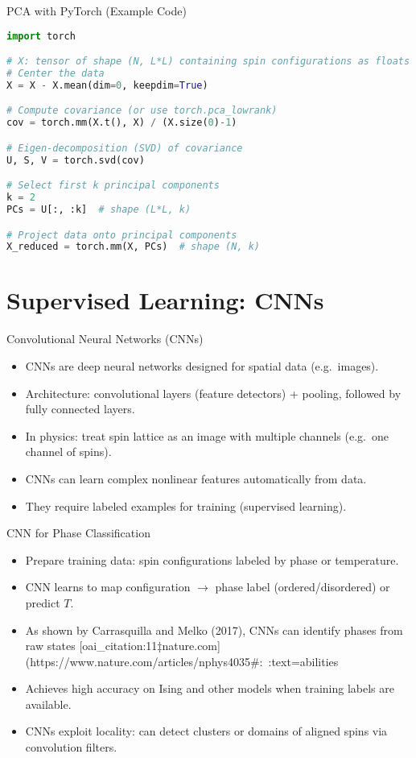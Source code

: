 \documentclass{beamer}
\begin{document}
\begin{frame}[fragile]{PCA with PyTorch (Example Code)}
 \begin{lstlisting}[language=Python]
import torch

# X: tensor of shape (N, L*L) containing spin configurations as floats (e.g. +1/-1)
# Center the data
X = X - X.mean(dim=0, keepdim=True)

# Compute covariance (or use torch.pca_lowrank)
cov = torch.mm(X.t(), X) / (X.size(0)-1)

# Eigen-decomposition (SVD) of covariance
U, S, V = torch.svd(cov)

# Select first k principal components
k = 2
PCs = U[:, :k]  # shape (L*L, k)

# Project data onto principal components
X_reduced = torch.mm(X, PCs)  # shape (N, k)
 \end{lstlisting}
\end{frame}

\section{Supervised Learning: CNNs}

\begin{frame}{Convolutional Neural Networks (CNNs)}
 \begin{itemize}
   \item CNNs are deep neural networks designed for spatial data (e.g.\ images).
   \item Architecture: convolutional layers (feature detectors) + pooling, followed by fully connected layers.
   \item In physics: treat spin lattice as an image with multiple channels (e.g.\ one channel of spins).
   \item CNNs can learn complex nonlinear features automatically from data.
   \item They require labeled examples for training (supervised learning).
 \end{itemize}
\end{frame}

\begin{frame}{CNN for Phase Classification}
 \begin{itemize}
   \item Prepare training data: spin configurations labeled by phase or temperature.
   \item CNN learns to map configuration $\to$ phase label (ordered/disordered) or predict $T$.
   \item As shown by Carrasquilla and Melko (2017), CNNs can identify phases from raw states [oai_citation:11‡nature.com](https://www.nature.com/articles/nphys4035#:~:text=abilities%
   \item Achieves high accuracy on Ising and other models when training labels are available.
   \item CNNs exploit locality: can detect clusters or domains of aligned spins via convolution filters.
 \end{itemize}
\end{frame}
\end{document}
